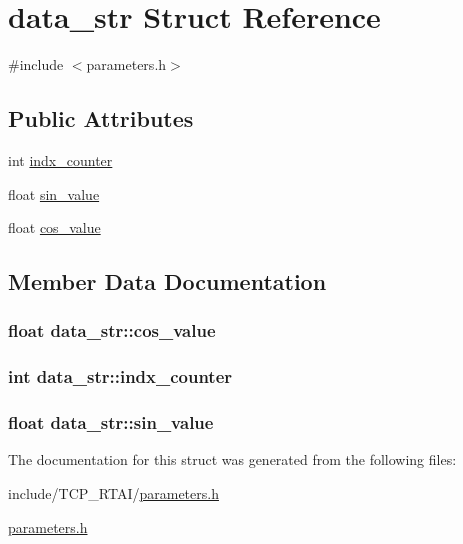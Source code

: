 \hypertarget{structdata__str}{
\section{data\_\-str Struct Reference}
\label{structdata__str}
}


{\ttfamily \#include $<$parameters.h$>$}

\subsection*{Public Attributes}
\begin{DoxyCompactItemize}
\item 
int \hyperlink{structdata__str_a3c0ac5cc4f62a64e40e5958d5eb8c72e}{indx\_\-counter}
\item 
float \hyperlink{structdata__str_a9c96737c48bcc436f68248138d5306e5}{sin\_\-value}
\item 
float \hyperlink{structdata__str_ac2c55d22bc5e8f0f07647ecd6772be52}{cos\_\-value}
\end{DoxyCompactItemize}


\subsection{Member Data Documentation}
\hypertarget{structdata__str_ac2c55d22bc5e8f0f07647ecd6772be52}{
\subsubsection[{cos\_\-value}]{\setlength{\rightskip}{0pt plus 5cm}float {\bf data\_\-str::cos\_\-value}}}
\label{structdata__str_ac2c55d22bc5e8f0f07647ecd6772be52}
\hypertarget{structdata__str_a3c0ac5cc4f62a64e40e5958d5eb8c72e}{
\subsubsection[{indx\_\-counter}]{\setlength{\rightskip}{0pt plus 5cm}int {\bf data\_\-str::indx\_\-counter}}}
\label{structdata__str_a3c0ac5cc4f62a64e40e5958d5eb8c72e}
\hypertarget{structdata__str_a9c96737c48bcc436f68248138d5306e5}{
\subsubsection[{sin\_\-value}]{\setlength{\rightskip}{0pt plus 5cm}float {\bf data\_\-str::sin\_\-value}}}
\label{structdata__str_a9c96737c48bcc436f68248138d5306e5}


The documentation for this struct was generated from the following files:\begin{DoxyCompactItemize}
\item 
include/TCP\_\-RTAI/\hyperlink{include_2TCP__RTAI_2parameters_8h}{parameters.h}\item 
\hyperlink{parameters_8h}{parameters.h}\end{DoxyCompactItemize}
